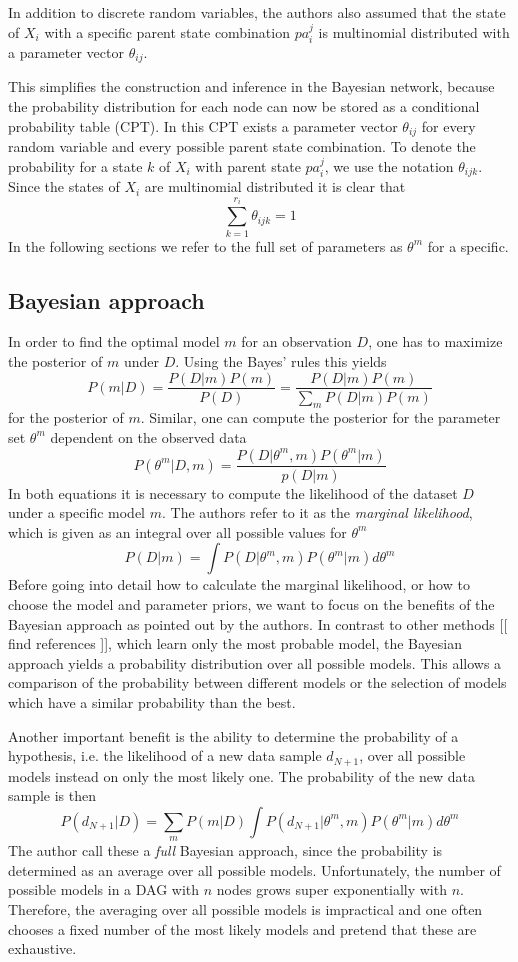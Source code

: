 \documentclass{article}
\begin{document}
	In addition	to discrete random variables, the authors also assumed that the state of $X_i$ with a specific
	parent state combination $pa_i^j$ is multinomial distributed with a parameter vector $\theta_{ij}$.
	
	This simplifies the construction and inference in the Bayesian network,	because the probability
  distribution for each node can now be stored as a conditional probability table (CPT). In this CPT
	exists a parameter vector $\theta_{ij}$ for every random variable and every possible parent state
	combination. To denote the probability for a state $k$ of $X_i$ with parent state $pa_i^j$, we
	use the notation $\theta_{ijk}$. Since the states of $X_i$ are multinomial distributed it is clear
	that
	\[
		\sum_{k=1}^{r_i} \theta_{ijk} = 1
	\]
	In the following sections we refer to the full set of parameters as $\theta^m$ for a specific.	
	
	\subsection{Bayesian approach}
	In order to find the optimal model $m$ for an observation $D$, one has to maximize the posterior of $m$
	under $D$. Using the Bayes' rules this yields 
	\[
		P(m|D) = \frac{P(D|m)P(m)}{P(D)}=\frac{P(D|m)P(m)}{\sum_m P(D|m)P(m)}
	\]
	for the posterior of $m$. Similar, one can compute the posterior for the parameter set $\theta^m$ dependent
	on the observed data
	\[
		P(\theta^m|D,m)= \frac{P(D|\theta^m,m)P(\theta^m|m)}{p(D|m)}
	\]
	In both equations it is necessary to compute the likelihood of the dataset $D$ under a specific model $m$.
	The authors refer to it as the \textit{marginal likelihood}, which is given as an integral over all
	possible values for $\theta^m$
	\[
		P(D|m) = \int P(D|\theta^m,m)P(\theta^m|m) d\theta^m
	\]
	Before going into detail how to calculate the marginal likelihood, or how to choose the model and parameter
	priors, we want to focus on the benefits of the Bayesian approach as pointed out by the authors. In
	contrast to other methods [[ find references ]], which learn only the most probable model, the
	Bayesian approach yields a probability distribution over all possible models. This allows a 
	comparison of the probability between different models or the selection of models which have a similar
	probability than the best.
	
	Another important benefit is the ability to determine the probability of a hypothesis,
	i.e. the likelihood of a	new data sample $d_{N+1}$, over all possible models
	instead on only the most likely one. The probability of the new data sample is then
	\[
		P(d_{N+1}|D)=\sum_m P(m|D)\int P(d_{N+1}|\theta^m,m)P(\theta^m|m)d\theta^m
	\]
	The author call these a \textit{full} Bayesian approach, since the probability is determined as an average
	over all possible models. Unfortunately, the number of possible models in a DAG with $n$ nodes grows
	super exponentially with $n$. Therefore, the averaging over all possible models is impractical and
	one often chooses a fixed number of the most likely models and pretend that these are exhaustive.
	
\end{document}
